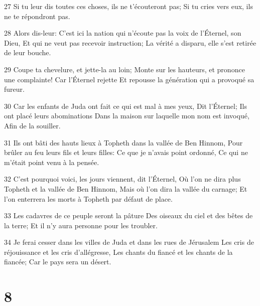 \par 27 Si tu leur dis toutes ces choses, ils ne t'écouteront pas; Si tu cries vers eux, ils ne te répondront pas.
\par 28 Alors dis-leur: C'est ici la nation qui n'écoute pas la voix de l'Éternel, son Dieu, Et qui ne veut pas recevoir instruction; La vérité a disparu, elle s'est retirée de leur bouche.
\par 29 Coupe ta chevelure, et jette-la au loin; Monte sur les hauteurs, et prononce une complainte! Car l'Éternel rejette Et repousse la génération qui a provoqué sa fureur.
\par 30 Car les enfants de Juda ont fait ce qui est mal à mes yeux, Dit l'Éternel; Ils ont placé leurs abominations Dans la maison sur laquelle mon nom est invoqué, Afin de la souiller.
\par 31 Ils ont bâti des hauts lieux à Topheth dans la vallée de Ben Hinnom, Pour brûler au feu leurs fils et leurs filles: Ce que je n'avais point ordonné, Ce qui ne m'était point venu à la pensée.
\par 32 C'est pourquoi voici, les jours viennent, dit l'Éternel, Où l'on ne dira plus Topheth et la vallée de Ben Hinnom, Mais où l'on dira la vallée du carnage; Et l'on enterrera les morts à Topheth par défaut de place.
\par 33 Les cadavres de ce peuple seront la pâture Des oiseaux du ciel et des bêtes de la terre; Et il n'y aura personne pour les troubler.
\par 34 Je ferai cesser dans les villes de Juda et dans les rues de Jérusalem Les cris de réjouissance et les cris d'allégresse, Les chants du fiancé et les chants de la fiancée; Car le pays sera un désert.

\chapter{8}

